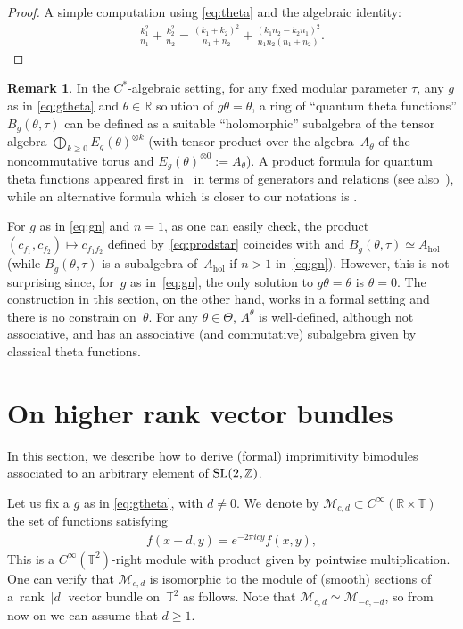 \documentclass[pdftex]{sigma}
\numberwithin{equation}{section}
\theoremstyle{definition}
\newtheorem{rem}[thm]{Remark}
\newcommand{\R}{\mathbb{R}}
\newcommand{\Z}{\mathbb{Z}}
\newcommand{\T}{\mathbb{T}}
\begin{document}
\begin{proof}
A simple computation using \eqref{eq:theta} and the algebraic identity:
\begin{gather*}
\frac{k_1^2}{n_1}+\frac{k_2^2}{n_2}=
\frac{(k_1+k_2)^2}{n_1+n_2}+
\frac{(k_1n_2-k_2n_1)^2}{n_1n_2(n_1+n_2)}.\tag*{\qed}
\end{gather*}
 \renewcommand{\qed}{}
\end{proof}

\begin{rem}
In the $C^*$-algebraic setting,
for any f\/ixed modular parameter $\tau$, any $g$ as in \eqref{eq:gtheta} and $\theta\in\R$ solution of $g\theta=\theta$, a ring of ``quantum theta functions'' $B_g(\theta,\tau)$ can be def\/ined as a suitable ``holomorphic'' subalgebra of the tensor algebra $\bigoplus_{k\geq 0}E_g(\theta)^{\otimes k}$ (with tensor product over the algebra~$A_\theta$ of the noncommutative torus
and $E_g(\theta)^{\otimes 0}:=A_\theta$).
A product formula for quantum theta functions appeared f\/irst in~\cite{DS02} in terms of generators and relations (see also~\cite{PS02}), while an alternative formula which is closer to our notations is \cite[equation~(7.4)]{Vla06}.

For $g$ as in \eqref{eq:gn} and $n=1$, as one can easily check, the product $(c_{f_1},c_{f_2})\mapsto c_{f_1f_2}$ def\/ined by~\eqref{eq:prodstar} coincides with \cite[equation~(7.4)]{Vla06} and $B_g(\theta,\tau)\simeq A_{\mathrm{hol}}$
(while $B_g(\theta,\tau)$ is a subalgebra of~$A_{\mathrm{hol}}$ if $n>1$ in~\eqref{eq:gn}).
However, this is not surprising since, for~$g$ as in~\eqref{eq:gn}, the only solution to $g\theta=\theta$ is $\theta=0$.
The construction in this section, on the other hand, works in a formal setting and there is no constrain on~$\theta$. For any $\theta\in\Theta$, $A^\theta$ is well-def\/ined, although not associative, and has an associative (and commutative) subalgebra given by classical theta functions.
\end{rem}

\section{On higher rank vector bundles}\label{sec:6}
In this section, we describe how to derive (formal) imprimitivity bimodules associated to an arbitrary element of ${\rm SL}(2,\Z)$.

Let us f\/ix a $g$ as in \eqref{eq:gtheta}, with $d\neq 0$.
We denote by $\mathcal{M}_{c,d}\subset C^\infty(\R\times\T)$ the set of functions satisfying
\begin{gather}\label{eq:Mcd}
f(x+d,y)=e^{-2\pi icy}f(x,y) ,
\end{gather}
This is a $C^\infty(\T^2)$-right module with product given by pointwise multiplication.
One can verify that $\mathcal{M}_{c,d}$ is isomorphic to the module of (smooth) sections of a~rank~$|d|$ vector bundle on~$\T^2$ as follows.
Note that $\mathcal{M}_{c,d}\simeq\mathcal{M}_{-c,-d}$, so from now on we can assume that $d\geq 1$.
\end{document}
